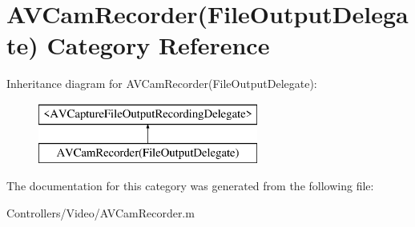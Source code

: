 \hypertarget{category_a_v_cam_recorder_07_file_output_delegate_08}{}\section{A\+V\+Cam\+Recorder(File\+Output\+Delegate) Category Reference}
\label{category_a_v_cam_recorder_07_file_output_delegate_08}
Inheritance diagram for A\+V\+Cam\+Recorder(File\+Output\+Delegate)\+:\begin{figure}[H]
\begin{center}
\leavevmode
\includegraphics[height=2.000000cm]{category_a_v_cam_recorder_07_file_output_delegate_08}
\end{center}
\end{figure}


The documentation for this category was generated from the following file\+:\begin{DoxyCompactItemize}
\item 
Controllers/\+Video/A\+V\+Cam\+Recorder.\+m\end{DoxyCompactItemize}

